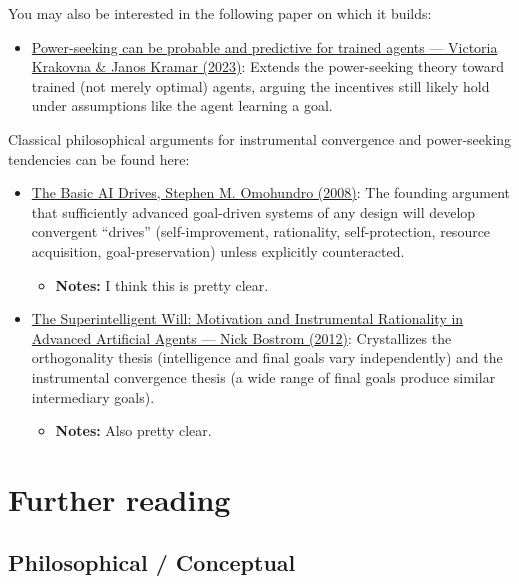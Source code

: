 \documentclass[11pt]{article}
\begin{document}
You may also be interested in the following paper on which it builds:

\begin{itemize}
  \item \href{https://arxiv.org/abs/2304.06528}{Power-seeking can be probable and predictive for trained agents --- Victoria Krakovna \& Janos Kramar (2023)}: Extends the power-seeking theory toward trained (not merely optimal) agents, arguing the incentives still likely hold under assumptions like the agent learning a goal.
\end{itemize}

Classical philosophical arguments for instrumental convergence and power-seeking tendencies can be found here:

\begin{itemize}
  \item \href{https://selfawaresystems.com/wp-content/uploads/2008/01/ai_drives_final.pdf}{The Basic AI Drives, Stephen M. Omohundro (2008)}: The founding argument that sufficiently advanced goal-driven systems of any design will develop convergent ``drives'' (self-improvement, rationality, self-protection, resource acquisition, goal-preservation) unless explicitly counteracted.
\begin{itemize}
  \item \textbf{Notes:} I think this is pretty clear.
\end{itemize}
  \item \href{https://nickbostrom.com/superintelligentwill.pdf}{The Superintelligent Will: Motivation and Instrumental Rationality in Advanced Artificial Agents --- Nick Bostrom (2012)}: Crystallizes the orthogonality thesis (intelligence and final goals vary independently) and the instrumental convergence thesis (a wide range of final goals produce similar intermediary goals).
\begin{itemize}
  \item \textbf{Notes:} Also pretty clear.
\end{itemize}
\end{itemize}

\section*{Further reading}

\subsection*{Philosophical / Conceptual}
\end{document}
